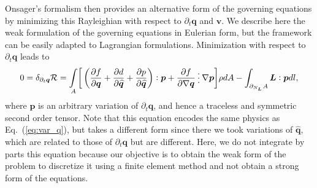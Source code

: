 Onsager's formalism then provides an alternative form of the governing equations by minimizing this Rayleighian with respect to $\partial_t \bm{q}$ and $\bm{v}$.  We describe here the weak formulation of the governing equations in Eulerian form, but the framework can be easily adapted to Lagrangian formulations. Minimization with respect to  $\partial_t\bm{q}$ leads to
\begin{align}
	\label{eq:weak_q_disc}
	0=\delta_{\partial_t \bm{q}} \mathcal{R}=  \underset{A}{\int}  \bigg[ \left(\frac{\partial  f}{\partial \bm{q}} +   \frac{\partial d}{\partial \widehat{\bm{q}}} +  \frac{\partial p}{\partial \widehat{\bm{q}}} \right):\bm{p} + \frac{\partial f}{\partial \nabla \bm{q}} \cdddot \, \nabla \bm{p} \bigg]\rho dA -   \int_{\partial_{N_{\bm{L}}}A} \bm{L}:\bm{p} dl, 
\end{align}
where $\bm{p}$ is an arbitrary variation of $\partial_t \bm{q}$, and hence a traceless and symmetric second order tensor. Note that this equation encodes the same physics as  Eq.~(\ref{eq:var_q}), but takes a different form since there we took variations of $ \widehat{{\bm{q}}}$, which are related to those of $\partial_t \bm{q}$ but are different.  Here, we do not integrate by parts this equation because our objective is to obtain the weak form of the problem to discretize it using a finite element method and not obtain a strong form of the equations. 

